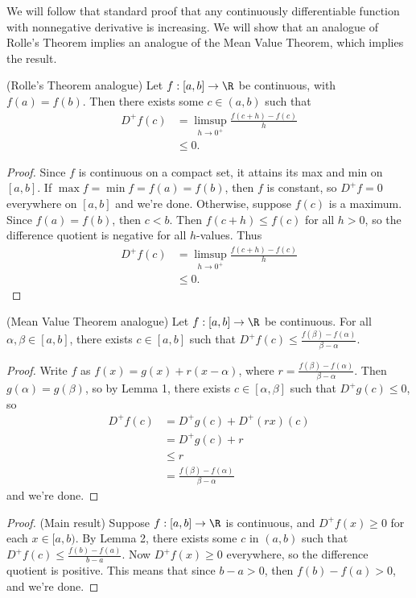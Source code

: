 \documentclass[12pt,letterpaper]{article}
\begin{document}
We will follow that standard proof that any continuously differentiable function with nonnegative derivative is increasing. We will show that an analogue of Rolle's Theorem implies an analogue of the Mean Value Theorem, which implies the result. 
\begin{lemma}(Rolle's Theorem analogue)
Let $f:[a,b]\to\R$ be continuous, with $f(a)=f(b)$. Then there exists some $c\in(a,b)$ such that 
\begin{align*}
D^+f(c)&=\limsup_{h\to0^+}\frac{f(c+h)-f(c)}{h} \\
&\leq 0.
\end{align*}
\end{lemma}
\begin{proof}
Since $f$ is continuous on a compact set, it attains its max and min on $[a,b]$. If $\max f=\min f=f(a)=f(b)$, then $f$ is constant, so $D^+f=0$ everywhere on $[a,b]$ and we're done. Otherwise, suppose $f(c)$ is a maximum. Since $f(a)=f(b)$, then $c<b$. Then $f(c+h)\leq f(c)$ for all $h>0$, so the difference quotient is negative for all $h$-values. Thus
\begin{align*}
D^+f(c)&=\limsup_{h\to0^+}\frac{f(c+h)-f(c)}{h} \\
%
&\leq 0.
\end{align*}
\end{proof}
\begin{lemma}(Mean Value Theorem analogue)
Let $f:[a,b]\to\R$ be continuous. For all $\alpha, \beta\in [a,b]$, there exists $c\in[a,b]$ such that $D^+f(c)\leq\frac{f(\beta)-f(\alpha)}{\beta-\alpha}$. 
\end{lemma}
\begin{proof}
Write $f$ as $f(x)=g(x)+r(x-\alpha)$, where $r=\frac{f(\beta)-f(\alpha)}{\beta-\alpha}$. Then $g(\alpha)=g(\beta)$, so by Lemma 1, there exists $c\in[\alpha,\beta]$ such that $D^+g(c)\leq0$, so 
\begin{align*}
D^+f(c)&=D^+g(c)+D^+(rx)(c)\\
&=D^+g(c)+r\\
&\leq r\\
&=\frac{f(\beta)-f(\alpha)}{\beta-\alpha}
\end{align*}
and we're done.
\end{proof}
\begin{proof}(Main result)
Suppose $f:[a,b]\to\R$ is continuous, and $D^+f(x)\geq0$ for each $x\in[a,b)$. By Lemma 2, there exists some $c$ in $(a,b)$ such that $D^+f(c)\leq\frac{f(b)-f(a)}{b-a}$. Now $D^+f(x)\geq0$ everywhere, so the difference quotient is positive. This means that since $b-a>0$, then $f(b)-f(a)>0$, and we're done. 
\end{proof}
\end{document}
